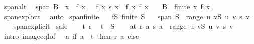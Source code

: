 \begin{isabellebody}
\isamarkupfalse%
\ span{\isacharunderscore}{\kern0pt}alt{\isacharcolon}{\kern0pt}\isanewline
\ \ {\isachardoublequoteopen}span\ B\ {\isacharequal}{\kern0pt}\ {\isacharbraceleft}{\kern0pt}{\isacharparenleft}{\kern0pt}{\isasymSum}x\ {\isacharbar}{\kern0pt}\ f\ x\ {\isasymnoteq}\ {}{\isachardot}{\kern0pt}\ f\ x\ {\isacharasterisk}{\kern0pt}s\ x{\isacharparenright}{\kern0pt}\ {\isacharbar}{\kern0pt}\ f{\isachardot}{\kern0pt}\ {\isacharbraceleft}{\kern0pt}x{\isachardot}{\kern0pt}\ f\ x\ {\isasymnoteq}\ {}{\isacharbraceright}{\kern0pt}\ {\isasymsubseteq}\ B\ {\isasymand}\ finite\ {\isacharbraceleft}{\kern0pt}x{\isachardot}{\kern0pt}\ f\ x\ {\isasymnoteq}\ {}{\isacharbraceright}{\kern0pt}{\isacharbraceright}{\kern0pt}{\isachardoublequoteclose}\isanewline
%
\isadelimproof
\ \ %
\endisadelimproof
%
\isatagproof
{}\isamarkupfalse%
\ span{\isacharunderscore}{\kern0pt}explicit{\isacharprime}{\kern0pt}\ \isamarkupfalse%
\ auto%
\endisatagproof
{\isafoldproof}%
%
\isadelimproof
\isanewline
%
\endisadelimproof
\isanewline
{}\isamarkupfalse%
\ span{\isacharunderscore}{\kern0pt}finite{\isacharcolon}{\kern0pt}\isanewline
\ \ \ fS{\isacharcolon}{\kern0pt}\ {\isachardoublequoteopen}finite\ S{\isachardoublequoteclose}\isanewline
\ \ \ {\isachardoublequoteopen}span\ S\ {\isacharequal}{\kern0pt}\ range\ {\isacharparenleft}{\kern0pt}{\isasymlambda}u{\isachardot}{\kern0pt}\ {\isasymSum}v{\isasymin}S{\isachardot}{\kern0pt}\ u\ v\ {\isacharasterisk}{\kern0pt}s\ v{\isacharparenright}{\kern0pt}{\isachardoublequoteclose}\isanewline
%
\isadelimproof
\ \ %
\endisadelimproof
%
\isatagproof
{}\isamarkupfalse%
\ span{\isacharunderscore}{\kern0pt}explicit\isanewline
{}\isamarkupfalse%
\ safe\isanewline
\ \ \isamarkupfalse%
\ t\ r\ \isamarkupfalse%
\ {\isachardoublequoteopen}t\ {\isasymsubseteq}\ S{\isachardoublequoteclose}\ \isamarkupfalse%
\ \isamarkupfalse%
\ {\isachardoublequoteopen}{\isacharparenleft}{\kern0pt}{\isasymSum}a{\isasymin}t{\isachardot}{\kern0pt}\ r\ a\ {\isacharasterisk}{\kern0pt}s\ a{\isacharparenright}{\kern0pt}\ {\isasymin}\ range\ {\isacharparenleft}{\kern0pt}{\isasymlambda}u{\isachardot}{\kern0pt}\ {\isasymSum}v{\isasymin}S{\isachardot}{\kern0pt}\ u\ v\ {\isacharasterisk}{\kern0pt}s\ v{\isacharparenright}{\kern0pt}{\isachardoublequoteclose}\isanewline
\ \ \ \ \isamarkupfalse%
\ {\isacharparenleft}{\kern0pt}intro\ image{\isacharunderscore}{\kern0pt}eqI{\isacharbrackleft}{\kern0pt}of\ {\isacharunderscore}{\kern0pt}\ {\isacharunderscore}{\kern0pt}\ {\isachardoublequoteopen}{\isasymlambda}a{\isachardot}{\kern0pt}\ if\ a\ {\isasymin}\ t\ then\ r\ a\ else\ {}{\isachardoublequoteclose}{\isacharbrackright}{\kern0pt}{\isacharparenright}{\kern0pt}\isanewline

\end{isabellebody}
